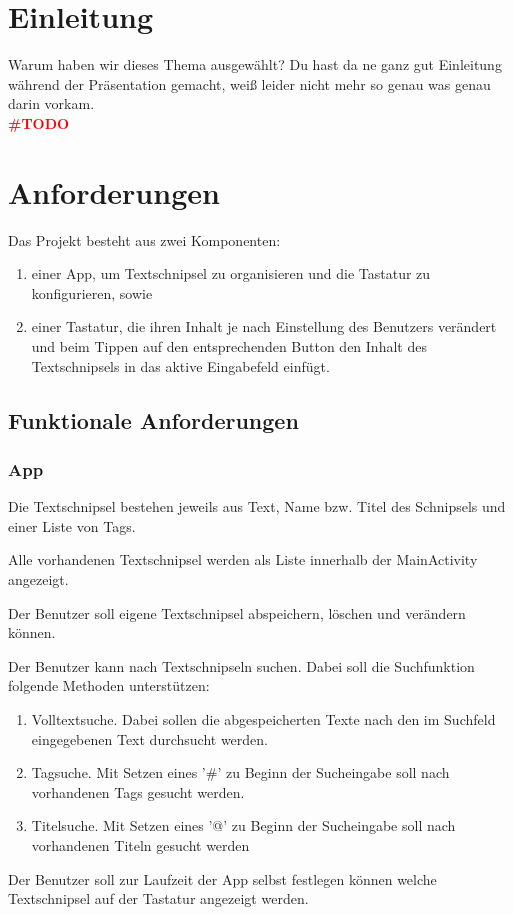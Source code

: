 \documentclass[11pt]{article}
\begin{document}
\section{Einleitung}
	Warum haben wir dieses Thema ausgewählt? Du hast da ne ganz gut Einleitung während der Präsentation gemacht, weiß leider nicht mehr so genau was genau darin vorkam.\\
	\textcolor{red}{\textbf{{\LARGE \#TODO}}}
	

\section{Anforderungen}
	Das Projekt besteht aus zwei Komponenten:
	\begin{enumerate}
		\item einer App, um Textschnipsel zu organisieren und die Tastatur zu konfigurieren, sowie
		\item einer Tastatur, die ihren Inhalt je nach Einstellung des Benutzers verändert und beim Tippen auf den entsprechenden Button den Inhalt des Textschnipsels in das aktive Eingabefeld einfügt.
	\end{enumerate}
	\subsection{Funktionale Anforderungen}
		\subsubsection{App}
		\begin{FA}
			\item Die Textschnipsel bestehen jeweils aus Text, Name bzw. Titel des Schnipsels und einer Liste von Tags.
			\item Alle vorhandenen Textschnipsel werden als Liste innerhalb der MainActivity angezeigt.
			\item Der Benutzer soll eigene Textschnipsel abspeichern, löschen und verändern können.
			\item Der Benutzer kann nach Textschnipseln suchen. Dabei soll die Suchfunktion folgende Methoden unterstützen:
				\begin{enumerate}
					\item Volltextsuche. Dabei sollen die abgespeicherten Texte nach den im Suchfeld eingegebenen Text durchsucht werden.
					\item Tagsuche. Mit Setzen eines '\#' zu Beginn der Sucheingabe soll nach vorhandenen Tags gesucht werden.
					\item Titelsuche. Mit Setzen eines '@' zu Beginn der Sucheingabe soll nach vorhandenen Titeln gesucht werden
				\end{enumerate}
			\item Der Benutzer soll zur Laufzeit der App selbst festlegen können welche Textschnipsel auf der Tastatur angezeigt werden. 
		\end{FA}
		
\end{document}
